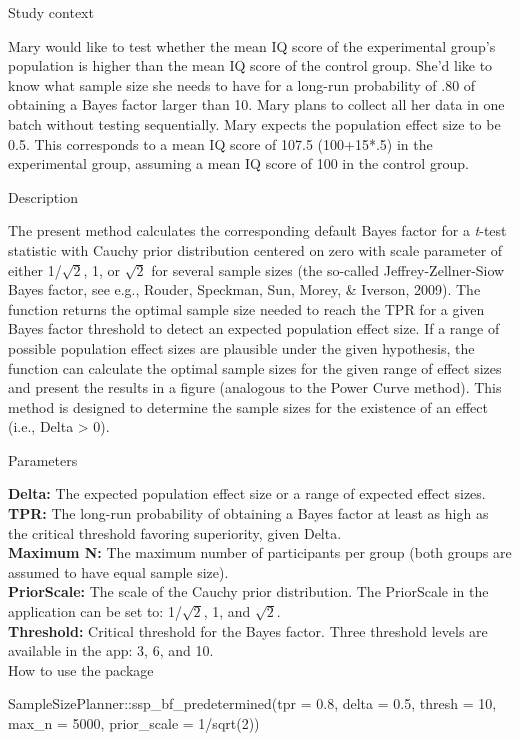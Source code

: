 \documentclass[
  english,
  man,floatsintext]{apa6}
\newenvironment{Shaded}{\begin{snugshade}}{\end{snugshade}}
\newcommand{\AttributeTok}[1]{\textcolor[rgb]{0.77,0.63,0.00}{#1}}
\newcommand{\DecValTok}[1]{\textcolor[rgb]{0.00,0.00,0.81}{#1}}
\newcommand{\FloatTok}[1]{\textcolor[rgb]{0.00,0.00,0.81}{#1}}
\newcommand{\FunctionTok}[1]{\textcolor[rgb]{0.00,0.00,0.00}{#1}}
\newcommand{\NormalTok}[1]{#1}
\newcommand{\SpecialCharTok}[1]{\textcolor[rgb]{0.00,0.00,0.00}{#1}}
\begin{document}
Study context

Mary would like to test whether the mean IQ score of the experimental group's population is higher than the mean IQ score of the control group. She'd like to know what sample size she needs to have for a long-run probability of .80 of obtaining a Bayes factor larger than 10. Mary plans to collect all her data in one batch without testing sequentially. Mary expects the population effect size to be 0.5. This corresponds to a mean IQ score of 107.5 (100+15*.5) in the experimental group, assuming a mean IQ score of 100 in the control group.

Description

The present method calculates the corresponding default Bayes factor for a \emph{t}-test statistic with Cauchy prior distribution centered on zero with scale parameter of either 1/\(\sqrt{2}\), 1, or \(\sqrt{2}\) for several sample sizes (the so-called Jeffrey-Zellner-Siow Bayes factor, see e.g., Rouder, Speckman, Sun, Morey, \& Iverson, 2009). The function returns the optimal sample size needed to reach the TPR for a given Bayes factor threshold to detect an expected population effect size. If a range of possible population effect sizes are plausible under the given hypothesis, the function can calculate the optimal sample sizes for the given range of effect sizes and present the results in a figure (analogous to the Power Curve method). This method is designed to determine the sample sizes for the existence of an effect (i.e., Delta \textgreater{} 0).

Parameters

\textbf{Delta:} The expected population effect size or a range of expected effect sizes.\\
\textbf{TPR:} The long-run probability of obtaining a Bayes factor at least as high as the critical threshold favoring superiority, given Delta.\\
\textbf{Maximum N:} The maximum number of participants per group (both groups are assumed to have equal sample size).\\
\textbf{PriorScale:} The scale of the Cauchy prior distribution. The PriorScale in the application can be set to: 1/\(\sqrt{2}\), 1, and \(\sqrt{2}\).\\
\textbf{Threshold:} Critical threshold for the Bayes factor. Three threshold levels are available in the app: 3, 6, and 10.\\

How to use the package

\begin{Shaded}
\begin{Highlighting}[]
\NormalTok{SampleSizePlanner}\SpecialCharTok{::}\FunctionTok{ssp\_bf\_predetermined}\NormalTok{(}\AttributeTok{tpr =} \FloatTok{0.8}\NormalTok{, }\AttributeTok{delta =} \FloatTok{0.5}\NormalTok{,}
    \AttributeTok{thresh =} \DecValTok{10}\NormalTok{, }\AttributeTok{max\_n =} \DecValTok{5000}\NormalTok{, }\AttributeTok{prior\_scale =} \DecValTok{1}\SpecialCharTok{/}\FunctionTok{sqrt}\NormalTok{(}\DecValTok{2}\NormalTok{))}
\end{Highlighting}
\end{Shaded}
\end{document}
